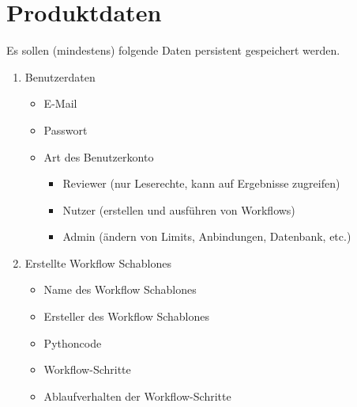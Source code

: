 \chapter{Produktdaten}
Es sollen (mindestens) folgende Daten persistent gespeichert werden.

\renewcommand{\labelenumi}{/PD\arabic{enumi}0/}
 \begin{enumerate}
    \item Benutzerdaten
    \begin{itemize}
        \setlength\itemsep{-1em}
        \item E-Mail
        \item Passwort
        \item Art des Benutzerkonto
        \begin{itemize}
            \setlength\itemsep{-1em}
            \item \gls{Reviewer} (nur Leserechte, kann auf Ergebnisse zugreifen)
            \item \gls{Nutzer} (erstellen und ausführen von Workflows)
            \item \gls{Admin} (ändern von Limits, Anbindungen, Datenbank, etc.)
        \end{itemize}
    \end{itemize}
    
    \item Erstellte \glspl{Workflow Schablone}
        \begin{itemize}
        \setlength\itemsep{-1em}
        \item Name des \glspl{Workflow Schablone}
        \item Ersteller des \glspl{Workflow Schablone}
        \item Pythoncode
        \item \gls{Workflow}-Schritte
        \item Ablaufverhalten der \gls{Workflow}-Schritte
    \end{itemize}
    

\end{enumerate}
